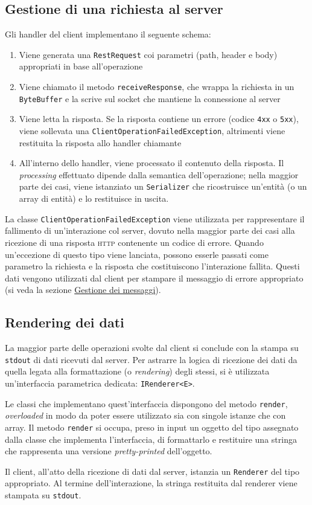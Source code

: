 \documentclass[a4paper,8pt]{article} %
\def\code#1{\texttt{#1}}
\begin{document}
\subsection{Gestione di una richiesta al server}
Gli handler del client implementano il seguente schema:
\begin{enumerate}
    \item Viene generata una \code{RestRequest} coi parametri (path, header e body) appropriati in base all'operazione
    \item Viene chiamato il metodo \code{receiveResponse}, che wrappa la richiesta in un \code{ByteBuffer} e la scrive sul socket che mantiene la connessione al server
    \item Viene letta la risposta. Se la risposta contiene un errore (codice \code{4xx} o \code{5xx}), viene sollevata una \code{ClientOperationFailedException}, altrimenti viene restituita la risposta allo handler chiamante
    \item All'interno dello handler, viene processato il contenuto della risposta. Il \emph{processing} effettuato dipende dalla semantica dell'operazione; nella maggior parte dei casi, viene istanziato un \code{Serializer} che ricostruisce un'entità (o un array di entità) e lo restituisce in uscita.
\end{enumerate}
La classe \code{ClientOperationFailedException} viene utilizzata per rappresentare il fallimento di un'interazione col server, dovuto nella maggior parte dei casi alla ricezione di una risposta \textsc{http} contenente un codice di errore.
Quando un'eccezione di questo tipo viene lanciata, possono esserle passati come parametro la richiesta e la risposta che costituiscono l'interazione fallita. Questi dati vengono utilizzati dal client per stampare il messaggio di errore appropriato (si veda la sezione \hyperref[sec:err_handling]{Gestione dei messaggi}).

\subsection{Rendering dei dati}
La maggior parte delle operazioni svolte dal client si conclude con la stampa su \code{stdout} di dati ricevuti dal server. Per astrarre la logica di ricezione dei dati da quella
legata alla formattazione (o \emph{rendering}) degli stessi, si è utilizzata un'interfaccia parametrica dedicata: \code{IRenderer<E>}.

\par Le classi che implementano quest'interfaccia dispongono del metodo \code{render}, \emph{overloaded} in modo da poter essere utilizzato sia con singole istanze che con array. Il metodo
\code{render} si occupa, preso in input un oggetto del tipo assegnato dalla classe che implementa l'interfaccia, di formattarlo e restituire una stringa che rappresenta una versione \emph{pretty-printed} dell'oggetto.
\par Il client, all'atto della ricezione di dati dal server, istanzia un \code{Renderer} del tipo appropriato. Al termine dell'interazione, la stringa restituita dal renderer viene stampata su \code{stdout}.
\end{document}
